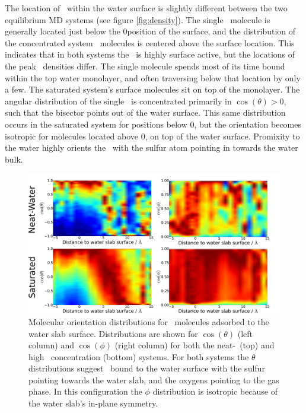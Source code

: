The location of \suldiox~within the water surface is slightly different between the two equilibrium MD systems (see figure \ref{fig:density}). The single \suldiox~molecule is generally located just below the 0\angs position of the surface, and the distribution of the concentrated system \suldiox~molecules is centered above the surface location. This indicates that in both systems the \suldiox~is highly surface active, but the locations of the peak \suldiox~densities differ. The single molecule spends most of its time bound within the top water monolayer, and often traversing below that location by only a few\angs. The saturated system's surface molecules sit on top of the monolayer. The angular distribution of the single \suldiox~is concentrated primarily in $\cos(\theta)>0$, such that the bisector points out of the water surface. This same distribution occurs in the saturated system for positions below 0\angs, but the orientation becomes isotropic for molecules located above 0\angs, on top of the water surface. Promixity to the water highly orients the \suldiox~with the sulfur atom pointing in towards the water bulk.

\begin{figure}[h!]
	\begin{center}
		\includegraphics[scale=1.0]{images/so2-angles/so2-angles.png}
		\caption{Molecular orientation distributions for \suldiox~molecules adsorbed to the water slab surface. Distributions are shown for $\cos(\theta)$ (left column) and $\cos(\phi)$ (right column) for both the neat-\wat~(top) and high \suldiox~concentration (bottom) systems. For both systems the $\theta$ distributions suggest \suldiox~bound to the water surface with the sulfur pointing towards the water slab, and the oxygens pointing to the gas phase. In this configuration the $\phi$ distribution is isotropic because of the water slab's in-plane symmetry.}
		\label{fig:so2-orientation}
	\end{center}
\end{figure}
